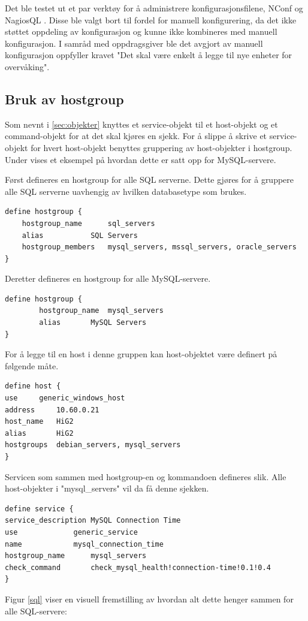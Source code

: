 Det ble testet ut et par verktøy for å administrere konfigurasjonsfilene, NConf \cite{nconf} og NagiosQL \cite{nagiosql}. Disse ble valgt bort til fordel for manuell konfigurering, da det ikke støttet oppdeling av konfigurasjon og kunne ikke kombineres med manuell konfigurasjon. I samråd med oppdragsgiver ble det avgjort av manuell konfigurasjon oppfyller kravet "Det skal være enkelt å legge til nye enheter for overvåking".

\subsection{Bruk av hostgroup}
Som nevnt i \ref{sec:objekter} knyttes et service-objekt til et host-objekt og et command-objekt for at det skal kjøres en sjekk. For å slippe å skrive et service-objekt for hvert host-objekt benyttes gruppering av host-objekter i hostgroup. Under vises et eksempel på hvordan dette er satt opp for MySQL-servere. 

Først defineres en hostgroup for alle SQL serverne. Dette gjøres for å gruppere alle SQL serverne uavhengig av hvilken databasetype som brukes. 
\begin{lstlisting}
define hostgroup {
	hostgroup_name		sql_servers
	alias 			SQL Servers
	hostgroup_members	mysql_servers, mssql_servers, oracle_servers
}
\end{lstlisting}
Deretter defineres en hostgroup for alle MySQL-servere.
\begin{lstlisting}
define hostgroup {
        hostgroup_name 	mysql_servers
        alias 		MySQL Servers
}
\end{lstlisting}
For å legge til en host i denne gruppen kan host-objektet være definert på følgende måte.
\begin{lstlisting}
define host {
use		generic_windows_host
address		10.60.0.21
host_name	HiG2
alias		HiG2
hostgroups	debian_servers, mysql_servers
}
\end{lstlisting}
Servicen som sammen med hostgroup-en og kommandoen defineres slik. Alle host-objekter i "mysql\_servers" vil da få denne sjekken.
\begin{lstlisting}
define service {
service_description	MySQL Connection Time
use 			generic_service
name 			mysql_connection_time
hostgroup_name 		mysql_servers
check_command 		check_mysql_health!connection-time!0.1!0.4
}
\end{lstlisting}

Figur \ref{sql} viser en visuell fremstilling av hvordan alt dette henger sammen for alle SQL-servere:

